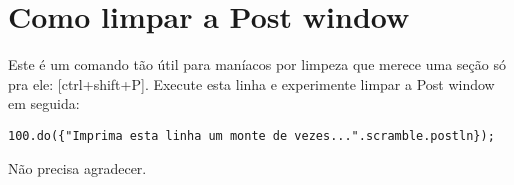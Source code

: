 \section{Como limpar a Post window}

Este é um comando tão útil para maníacos por limpeza que merece uma seção só pra ele: [ctrl+shift+P]. Execute esta linha e experimente limpar a Post window em seguida:

 
\begin{lstlisting}[style=SuperCollider-IDE, basicstyle=\scttfamily\footnotesize]
100.do({"Imprima esta linha um monte de vezes...".scramble.postln});
\end{lstlisting}
 
Não precisa agradecer.

